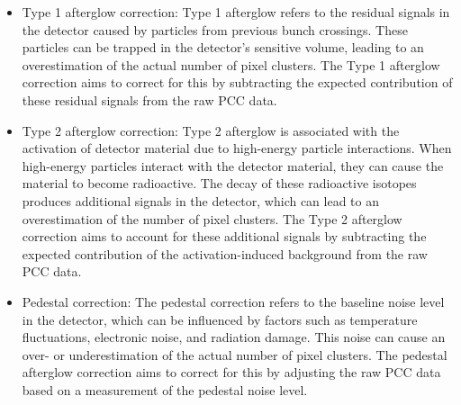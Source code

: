 \begin{itemize}

\item Type 1 afterglow correction: Type 1 afterglow refers to the residual signals in the detector caused by particles from previous bunch crossings. These particles can be trapped in the detector's sensitive volume, leading to an overestimation of the actual number of pixel clusters. The Type 1 afterglow correction aims to correct for this by subtracting the expected contribution of these residual signals from the raw PCC data.

\item Type 2 afterglow correction: Type 2 afterglow is associated with the activation of detector material due to high-energy particle interactions. When high-energy particles interact with the detector material, they can cause the material to become radioactive. The decay of these radioactive isotopes produces additional signals in the detector, which can lead to an overestimation of the number of pixel clusters. The Type 2 afterglow correction aims to account for these additional signals by subtracting the expected contribution of the activation-induced background from the raw PCC data.

\item Pedestal correction: The pedestal correction refers to the baseline noise level in the detector, which can be influenced by factors such as temperature fluctuations, electronic noise, and radiation damage. This noise can cause an over- or underestimation of the actual number of pixel clusters. The pedestal afterglow correction aims to correct for this by adjusting the raw PCC data based on a measurement of the pedestal noise level.

\end{itemize}

